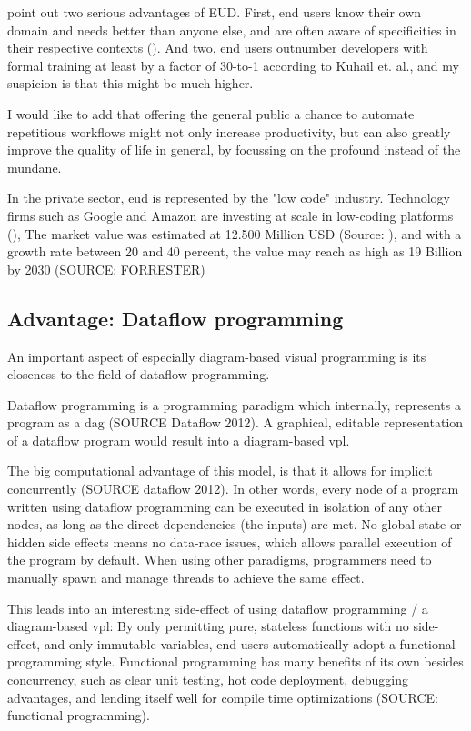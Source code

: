 \cite{kuhail_characterizing_2021} point out two serious advantages of EUD. 
First, end users know their own domain and needs better than anyone else, and are often aware of specificities in their respective contexts (\cite{kuhail_characterizing_2021}). 
And two, end users outnumber developers with formal training at least by a factor of 30-to-1 according to Kuhail et. al., and my suspicion is that this might be much higher.

I would like to add that offering the general public a chance to automate repetitious workflows might not only increase productivity, but can also greatly improve the quality of life in general, by focussing on the profound instead of the mundane. 

In the private sector, \ac{eud} is represented by the "low code" industry. 
Technology firms such as Google and Amazon are investing at scale in low-coding platforms (\cite{kuhail_characterizing_2021}),
The market value was estimated at 12.500 Million USD (Source: ), and with a growth rate between 20 and 40 percent, the value may reach as high as 19 Billion by 2030 (SOURCE: FORRESTER) 

\subsection{Advantage: Dataflow programming}
\label{sec:background:dataflow}
An important aspect of especially diagram-based visual programming is its closeness to the field of dataflow programming. 

Dataflow programming is a programming paradigm which internally, represents a program as a \ac{dag} (SOURCE Dataflow 2012). 
A graphical, editable representation of a dataflow program would result into a diagram-based \ac{vpl}.

The big computational advantage of this model, is that it allows for implicit concurrently (SOURCE dataflow 2012). 
In other words, every node of a program written using dataflow programming can be executed in isolation of any other nodes, as long as the direct dependencies (the inputs) are met. 
No global state or hidden side effects means no data-race issues, which allows parallel execution of the program by default.
When using other paradigms, programmers need to manually spawn and manage threads to achieve the same effect. 

This leads into an interesting side-effect of using dataflow programming / a diagram-based \ac{vpl}: 
By only permitting pure, stateless functions with no side-effect, and only immutable variables, end users automatically adopt a functional programming style.
Functional programming has many benefits of its own besides concurrency, such as clear unit testing, hot code deployment, debugging advantages, and lending itself well for compile time optimizations (SOURCE: functional programming).


